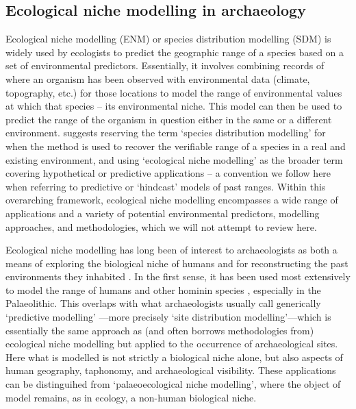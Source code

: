 \documentclass[
  authoryear,
  preprint]{elsarticle}
\begin{document}
\subsection{Ecological niche modelling in
archaeology}\label{ecological-niche-modelling-in-archaeology}

Ecological niche modelling (ENM) or species distribution modelling (SDM)
is widely used by ecologists to predict the geographic range of a
species based on a set of environmental predictors. Essentially, it
involves combining records of where an organism has been observed with
environmental data (climate, topography, etc.) for those locations to
model the range of environmental values at which that species -- its
environmental niche. This model can then be used to predict the range of
the organism in question either in the same or a different environment.
\citet{CITE} suggests reserving the term `species distribution
modelling' for when the method is used to recover the verifiable range
of a species in a real and existing environment, and using `ecological
niche modelling' as the broader term covering hypothetical or predictive
applications -- a convention we follow here when referring to predictive
or `hindcast' models of past ranges. Within this overarching framework,
ecological niche modelling encompasses a wide range of applications and
a variety of potential environmental predictors, modelling approaches,
and methodologies, which we will not attempt to review here.

Ecological niche modelling has long been of interest to archaeologists
as both a means of exploring the biological niche of humans and for
reconstructing the past environments they inhabited
\citep{DavidPollyEronen2011, FranklinEtAl2015}. In the first sense, it
has been used most extensively to model the range of humans and other
hominin species
\citep[e.g.][]{BenitoEtAl2017, YousefiEtAl2020, BanksEtAl2021, YaworskyEtAl2024a, YaworskyEtAl2024b, GuranEtAl2024},
especially in the Palaeolithic. This overlaps with what archaeologists
usually call generically `predictive modelling'
\citep{VerhagenWhitley2020}---more precisely `site distribution
modelling'---which is essentially the same approach as (and often
borrows methodologies from) ecological niche modelling but applied to
the occurrence of archaeological sites. Here what is modelled is not
strictly a biological niche alone, but also aspects of human geography,
taphonomy, and archaeological visibility. These applications can be
distinguihed from `palaeoecological niche modelling', where the object
of model remains, as in ecology, a non-human biological niche.
\end{document}
